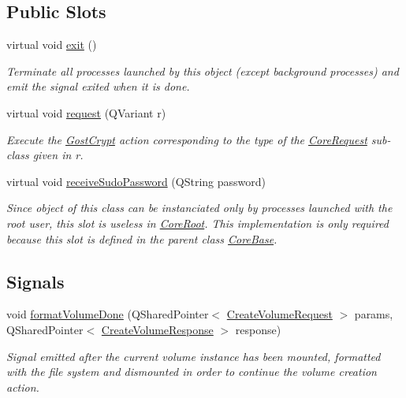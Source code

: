 \subsection*{Public Slots}
\begin{DoxyCompactItemize}
\item 
virtual void \hyperlink{class_gost_crypt_1_1_core_1_1_core_root_a9f12475644030457c3e111b57732ba45}{exit} ()
\begin{DoxyCompactList}\small\item\em Terminate all processes launched by this object (except background processes) and emit the signal exited when it is done. \end{DoxyCompactList}\item 
virtual void \hyperlink{class_gost_crypt_1_1_core_1_1_core_root_a99a63ffb40e076362f1d0aee5df34dbd}{request} (Q\+Variant r)
\begin{DoxyCompactList}\small\item\em Execute the \hyperlink{namespace_gost_crypt}{Gost\+Crypt} action corresponding to the type of the \hyperlink{struct_gost_crypt_1_1_core_1_1_core_request}{Core\+Request} sub-\/class given in r. \end{DoxyCompactList}\item 
virtual void \hyperlink{class_gost_crypt_1_1_core_1_1_core_root_a74ce55bc5d2cc8c1c13ec48c81aa84ce}{receive\+Sudo\+Password} (Q\+String password)
\begin{DoxyCompactList}\small\item\em Since object of this class can be instanciated only by processes launched with the root user, this slot is useless in \hyperlink{class_gost_crypt_1_1_core_1_1_core_root}{Core\+Root}. This implementation is only required because this slot is defined in the parent class \hyperlink{class_gost_crypt_1_1_core_1_1_core_base}{Core\+Base}. \end{DoxyCompactList}\end{DoxyCompactItemize}
\subsection*{Signals}
\begin{DoxyCompactItemize}
\item 
void \hyperlink{class_gost_crypt_1_1_core_1_1_core_root_a67efc84625566c7bc82313a317b73943}{format\+Volume\+Done} (Q\+Shared\+Pointer$<$ \hyperlink{struct_gost_crypt_1_1_core_1_1_create_volume_request}{Create\+Volume\+Request} $>$ params, Q\+Shared\+Pointer$<$ \hyperlink{struct_gost_crypt_1_1_core_1_1_create_volume_response}{Create\+Volume\+Response} $>$ response)
\begin{DoxyCompactList}\small\item\em Signal emitted after the current volume instance has been mounted, formatted with the file system and dismounted in order to continue the volume creation action. \end{DoxyCompactList}\end{DoxyCompactItemize}
